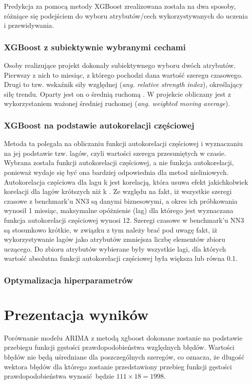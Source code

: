 \documentclass[11pt]{report}
\begin{document}
Predykcja za pomocą metody XGBoost zrealizowana została na dwa sposoby, różniące się podejściem do wyboru atrybutów/cech wykorzystywanych do uczenia i przewidywania.

\subsubsection{XGBoost z subiektywnie wybranymi cechami}
Osoby realizujące projekt dokonały subiektywnego wyboru dwóch atrybutów.
Pierwszy z nich to miesiąc, z którego pochodzi dana wartość szeregu czasowego.
Drugi to tzw. wskaźnik siły względnej (\textit{ang. relative strength index}), określający siłę trendu.
Oparty jest on o średnią ruchomą \cite{noauthor_relative_2018}.
W projekcie obliczany jest z wykorzystaniem ważonej średniej ruchomej (\textit{ang. weighted moving average}).

\subsubsection{XGBoost na podstawie autokorelacji częściowej}
Metoda ta polegała na obliczaniu funkcji autokorelacji częściowej i wyznaczaniu na jej podstawie tzw. lagów, czyli wartości szeregu przesuniętych w czasie.
Wybrana została funkcji autokorelacji częściowej, a nie funkcja autokorelacji, ponieważ wydaje się być ona bardziej odpowiednia dla metod nieliniowych.
Autokorelacja częściowa dla lagu k jest korelacją, która usuwa efekt jakichkolwiek korelacji dla lagów krótszych niż k \cite{cowpertwait_introductory_2009}.
Ze względu na fakt, iż wszystkie szeregi czasowe z benchmark'u NN3 są danymi biznesowymi, a okres ich próbkowania wynosił 1 miesiąc, maksymalne opóżnienie (lag) dla którego jest wyznaczana funkcja autokorelacji częściowej wynosi 12.
Szeregi czasowe w benchmark'u NN3 są stosunkowo krótkie, w związku z tym należy brać pod uwagę fakt, iż wykorzystywanie lagów jako atrybutów zmniejsza liczbę elementów zbioru uczącego.
Do zbioru atrybutów wybierane były wszystkie lagi, dla których wartość absolutna funkcji autokorelacji częściowej była większa lub równa 0.1.

\subsubsection{Optymalizacja hiperparametrów}


\section{Prezentacja wyników}
\color{red}
Porównanie modelu ARIMA z metodą xgboost dokonane zostanie na podstawie przebiegu funkcji gęstości prawdopodobieństwa względnych błędów.
Wartości błędów nie będą uśredniane dla poszczególnych szeregów, co oznacza, że długość wektora błędów dla którego zostanie przedstawiony przebieg funkcji gęstości prawdopodobieństwa wynosić będzie $111 \times 18 = 1998$.
\end{document}
